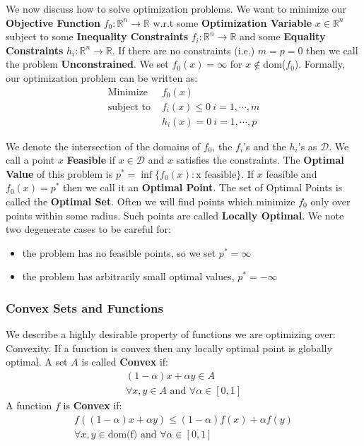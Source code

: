 \documentclass[]{article}
\theoremstyle{mattstyle}
\theoremstyle{definition}
\begin{document}
We now discuss how to solve optimization problems. We want to minimize our \textbf{Objective Function} $f_0 : \mathbb{R}^n \rightarrow \mathbb{R}$ w.r.t some  \textbf{Optimization Variable} $x \in \mathbb{R}^n$ subject to some \textbf{Inequality Constraints} $f_i: \mathbb{R}^n \rightarrow \mathbb{R}$ and some \textbf{Equality Constraints} $h_i: \mathbb{R}^n \rightarrow \mathbb{R}$. If there are no constraints (i.e.) $m=p=0$ then we call the problem \textbf{Unconstrained}. We set $f_0(x) = \infty$ for $x \notin$dom($f_0$).
Formally, our optimization problem can be written as:
\begin{align*}
\text{Minimize } & f_0(x) \\
\text{subject to } & f_i(x) \le 0 \ i = 1, \cdots, m\\
& h_i(x) = 0 \ i = 1, \cdots, p
\end{align*}

We denote the intersection of the domains of $f_0$, the $f_i$'s and the $h_i$'s as $\mathcal{D}$. We call a point $x$ \textbf{Feasible} if $x\in \mathcal{D}$ and $x$ satisfies the constraints. The \textbf{Optimal Value} of this problem is $p^*=\inf\{f_0(x): \text{x feasible}\}$. If $x$ feasible and $f_0(x) = p^*$ then we call it an \textbf{Optimal Point}. The set of Optimal Points is called the \textbf{Optimal Set}. Often we will find points which minimize $f_0$ only over points within some radius. Such points are called \textbf{Locally Optimal}.
We note two degenerate cases to be careful for:
\begin{itemize}
	\item the problem has no feasible points, so we set $p^*=\infty$
	\item the problem has arbitrarily small optimal values, $p^*=-\infty$
\end{itemize}

\subsubsection{Convex Sets and Functions}

We describe a highly desirable property of functions we are optimizing over: Convexity. If a function is convex then any locally optimal point is globally optimal.
A set $A$ is called \textbf{Convex} if:
\begin{align*}
(1-\alpha)x + \alpha y \in A \\
\forall x,y\in A \text{ and } \forall\alpha \in [0,1]
\end{align*} 
A function $f$ is \textbf{Convex} if:
\begin{align*}
f((1-\alpha)x + \alpha y) \le (1-\alpha)f(x) + \alpha f(y)\\
\forall x,y\in \text{dom(f)}\text{ and } \forall\alpha \in [0,1]
\end{align*} 
\end{document}
